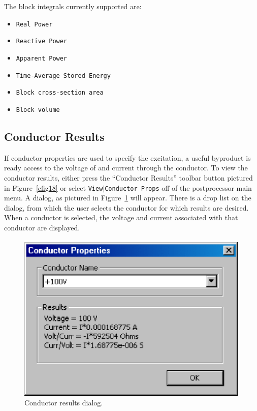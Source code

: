 The block integrals currently supported are:
\begin{itemize}
\item \texttt{Real Power}
\item \texttt{Reactive Power}
\item \texttt{Apparent Power}
\item \texttt{Time-Average Stored Energy}
\item \texttt{Block cross-section area}
\item \texttt{Block volume}
\end{itemize}
\subsection{Conductor Results}

If conductor properties are used to specify the excitation, a
useful byproduct is ready access to the voltage of and current through the
conductor. To view the conductor results, either press the ``Conductor Results''
toolbar button pictured in Figure~\ref{cfig18} or select \texttt{View$\vert
$Conductor Props} off of the postprocessor main menu. A dialog, as
pictured in Figure~\ref{cfig21} will appear. There is a drop list on the
dialog, from which the user selects the conductor for which results
are desired. When a conductor is selected, the voltage and current
associated with that conductor are displayed.

\begin{figure}[htbp]
\centerline{\includegraphics{cd7.ps}}
\caption{Conductor results dialog.}
\label{cfig21}
\end{figure}

